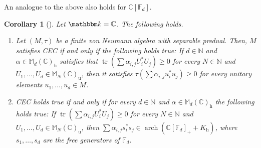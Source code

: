 \documentclass[12pt]{amsart}
\newtheorem{cor}[thm]{Corollary}
\theoremstyle{definition}
\begin{document}
An analogue to the above also holds for ${{\mathbb C}}[{{\mathbb F}}_d]$.
\begin{cor}[\cite{jpc}]
Let ${{\mathbbm k}}={{\mathbb C}}$. The following holds.
\begin{enumerate}[$\bullet$]
\item
Let $(M,\tau)$ be a finite von Neumann algebra with separable predual.
Then, $M$ satisfies CEC if and only if the following holds true:
If $d\in{{\mathbb N}}$ and $\alpha\in{{\mathbb M}}_d({{\mathbb C}})_{\mathrm{h}}$ satisfies that
$\operatorname*{tr}(\sum \alpha_{i,j}U_i^*U_j)\geq0$ for every $N\in{{\mathbb N}}$ and $U_1,\ldots,U_d\in{{\mathbb M}}_N({{\mathbb C}})_{\mathrm{u}}$,
then it satisfies $\tau(\sum \alpha_{i,j}u_i^*u_j)\geq0$ for every unitary elements $u_1,\ldots,u_d\in M$.
\item
CEC holds true if and only if for every $d\in{{\mathbb N}}$ and $\alpha\in{{\mathbb M}}_d({{\mathbb C}})_{\mathrm{h}}$ the following holds true:
If $\operatorname*{tr}(\sum \alpha_{i,j}U_i^*U_j)\geq0$ for every $N\in{{\mathbb N}}$ and $U_1,\ldots,U_d\in{{\mathbb M}}_N({{\mathbb C}})_{\mathrm{u}}$,
then $\sum \alpha_{i,j}s_i^*s_j\in \operatorname*{arch}({{\mathbb C}}[{{\mathbb F}}_d]_+ + K_{\mathrm{h}})$, where $s_1,\ldots,s_d$ are the
free generators of ${{\mathbb F}}_d$.
\end{enumerate}
\end{cor}
\end{document}
